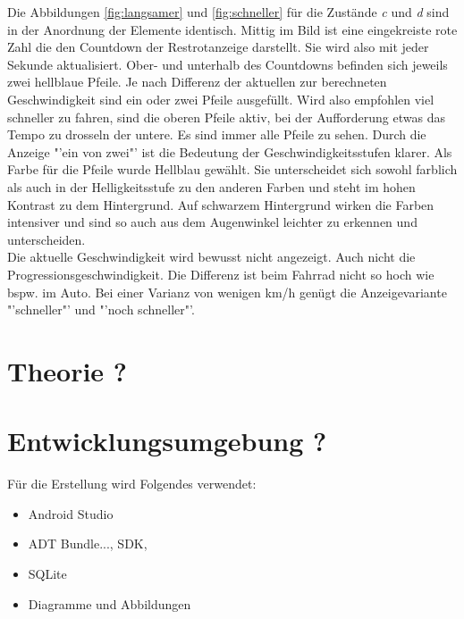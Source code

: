 Die Abbildungen \ref{fig:langsamer} und \ref{fig:schneller} für die Zustände \textit{c} und \textit{d} sind in der Anordnung der Elemente identisch. Mittig im Bild ist eine eingekreiste rote Zahl die den Countdown der Restrotanzeige darstellt. Sie wird also mit jeder Sekunde aktualisiert. Ober- und unterhalb des Countdowns befinden sich jeweils zwei hellblaue Pfeile. Je nach Differenz der aktuellen zur berechneten Geschwindigkeit sind ein oder zwei Pfeile ausgefüllt. Wird also empfohlen viel schneller zu fahren, sind die oberen Pfeile aktiv, bei der Aufforderung etwas das Tempo zu drosseln der untere. Es sind immer alle Pfeile zu sehen. Durch die Anzeige "'ein von zwei"' ist die Bedeutung der Geschwindigkeitsstufen klarer. Als Farbe für die Pfeile wurde Hellblau gewählt. Sie unterscheidet sich sowohl farblich als auch in der Helligkeitsstufe zu den anderen Farben und steht im hohen Kontrast zu dem Hintergrund. Auf schwarzem Hintergrund wirken die Farben intensiver und sind so auch aus dem Augenwinkel leichter zu erkennen und unterscheiden. \\
Die aktuelle Geschwindigkeit wird bewusst nicht angezeigt. Auch nicht die Progressionsgeschwindigkeit. Die Differenz ist beim Fahrrad nicht so hoch wie bspw. im Auto. Bei einer Varianz von wenigen km/h genügt die Anzeigevariante "'schneller"' und "'noch schneller"'.
\section{Theorie ?}
\section{Entwicklungsumgebung ?}
Für die Erstellung wird Folgendes verwendet:
\begin{itemize}
	\item Android Studio
	\item ADT Bundle..., SDK, 
	\item SQLite
	\item Diagramme und Abbildungen
\end{itemize}
